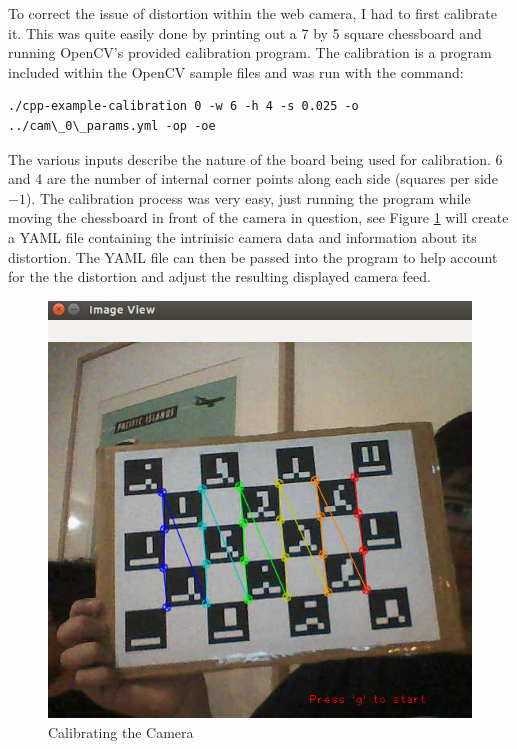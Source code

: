 \documentclass[11pt]{article}
\begin{document}
To correct the issue of distortion within the web 
camera, I had to first calibrate it. This was
quite easily done by printing out a 7 by 5 square chessboard and running
OpenCV's provided calibration program. The calibration is a program included
within the OpenCV sample files and was run with the command:

\begin{verbatim}
./cpp-example-calibration 0 -w 6 -h 4 -s 0.025 -o ../cam\_0\_params.yml -op -oe
\end{verbatim}

The various inputs describe the nature of the board being used
for calibration. 6 and 4 are the number of internal corner points along
each side (squares per side $- 1$). The calibration process was very easy,
just running the program while moving the chessboard in front of the
camera in question, see Figure \ref{cameraCalibration} will create 
a YAML file containing the intrinisic camera data and information 
about its distortion. The YAML file can then be passed into the program to
help account for the the distortion and adjust the resulting displayed 
camera feed.

\begin{figure}[H]
	\centering
	\includegraphics[scale=0.5]{pics/calibration.jpg}
	\caption{Calibrating the Camera}
	\label{cameraCalibration}
\end{figure}
\end{document}
